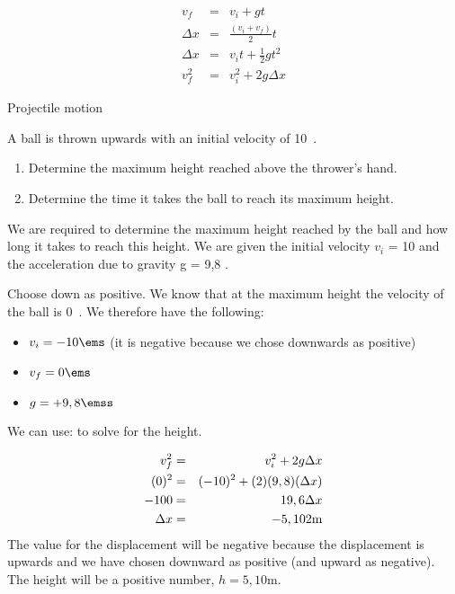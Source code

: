 \begin{eqnarray}
v_f &=& v_i + gt \label{eq:pg:eq1}\\
\Delta x &=& \frac{(v_i + v_f)}{2} t\label{eq:pg:eq2}\\
\Delta x &=& v_it + \frac{1}{2}gt^2 \label{eq:pg:eq3}\\
v_f^2 &=& v_i^2 + 2g\Delta x \label{eq:pg:eq4}
\end{eqnarray}
\begin{wex}{Projectile motion}{A ball is thrown upwards with an initial velocity of 10~\ms. \begin{enumerate}
	\item Determine the maximum height reached above the thrower's hand.
	\item Determine the time it takes the ball to reach its maximum height.
	\end{enumerate}}
{
We are required to determine the maximum height reached by the ball and how long it takes to reach this height. We are given the initial velocity $v_i$ = 10 \ms and the acceleration due to gravity g = 9,8 \mss.

Choose down as positive. We know that at the maximum height the velocity of the ball is 0~\ms. We therefore have the following:
\begin{itemize}
\item{$v_i=-10\ems$ (it is negative because we chose downwards as positive)}
\item{$v_f=0\ems$}
\item{$g=+9,8\emss$}
\end{itemize}

We can use:
to solve for the height.

\begin{eqnarray*}
v_f^2 &=& v_i^2 + 2g\Delta x\\
(0)^{2} &=& (-10)^{2} + (2)(9,8)  (\Delta x)\\
-100 &=& 19,6 \Delta x\\
\Delta x &=& -5,102 \rm{m}
\end{eqnarray*}
The value for the displacement will be negative because the displacement is upwards and we have chosen downward as positive (and upward as negative). The height will be a positive number, $h=5,10$m.

}
\end{wex}
